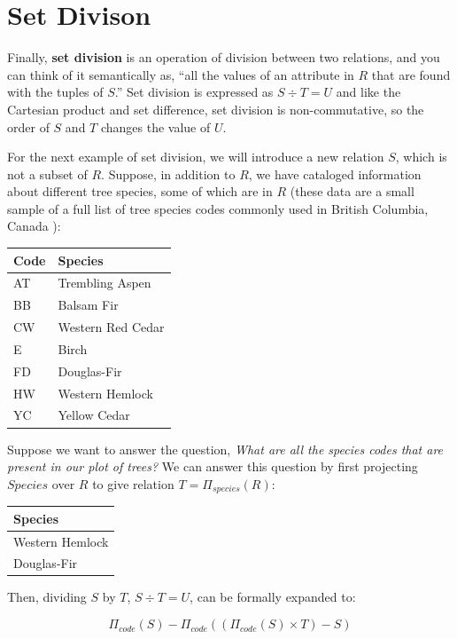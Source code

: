 \documentclass[
]{book}
\begin{document}
\hypertarget{set-divison}{%
\section{Set Divison}\label{set-divison}}

Finally, \textbf{set division} is an operation of division between two relations, and you can think of it semantically as, ``all the values of an attribute in \(R\) that are found with the tuples of \(S\).'' Set division is expressed as \(S÷T=U\) and like the Cartesian product and set difference, set division is non-commutative, so the order of \(S\) and \(T\) changes the value of \(U\).

For the next example of set division, we will introduce a new relation \(S\), which is not a subset of \(R\). Suppose, in addition to \(R\), we have cataloged information about different tree species, some of which are in \(R\) (these data are a small sample of a full list of tree species codes commonly used in British Columbia, Canada \citep{forest_practices_branch_silviculture_2005}):

\begin{tabular}{ll}
\toprule
Code & Species\\
\midrule
AT & Trembling Aspen\\
BB & Balsam Fir\\
CW & Western Red Cedar\\
E & Birch\\
FD & Douglas-Fir\\
\addlinespace
HW & Western Hemlock\\
YC & Yellow Cedar\\
\bottomrule
\end{tabular}

Suppose we want to answer the question, \emph{What are all the species codes that are present in our plot of trees?} We can answer this question by first projecting \(Species\) over \(R\) to give relation \(T=Π_{species}(R)\):

\begin{tabular}{l}
\toprule
Species\\
\midrule
Western Hemlock\\
Douglas-Fir\\
\bottomrule
\end{tabular}

Then, dividing \(S\) by \(T\), \(S÷T=U\), can be formally expanded to:

\[
Π_{code}(S) - Π_{code}((Π_{code}(S) × T) - S)
\]
\end{document}
